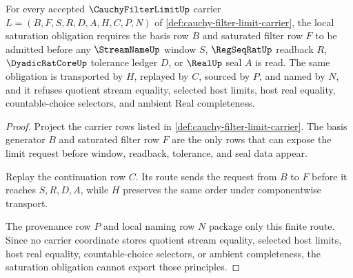 \begin{theorem}
\label{thm:cauchy-filter-limit-basis-saturation-obligation}
For every accepted $\CauchyFilterLimitUp$ carrier $L=(B,F,S,R,D,A,H,C,P,N)$ of \autoref{def:cauchy-filter-limit-carrier}, the local saturation obligation requires the basis row $B$ and saturated filter row $F$ to be admitted before any $\StreamNameUp$ window $S$, $\RegSeqRatUp$ readback $R$, $\DyadicRatCoreUp$ tolerance ledger $D$, or $\RealUp$ seal $A$ is read. The same obligation is transported by $H$, replayed by $C$, sourced by $P$, and named by $N$, and it refuses quotient stream equality, selected host limits, host real equality, countable-choice selectors, and ambient Real completeness.
\end{theorem}
\begin{proof}
Project the carrier rows listed in \autoref{def:cauchy-filter-limit-carrier}. The basis generator $B$ and saturated filter row $F$ are the only rows that can expose the limit request before window, readback, tolerance, and seal data appear.

Replay the continuation row $C$. Its route sends the request from $B$ to $F$ before it reaches $S,R,D,A$, while $H$ preserves the same order under componentwise transport.

The provenance row $P$ and local naming row $N$ package only this finite route. Since no carrier coordinate stores quotient stream equality, selected host limits, host real equality, countable-choice selectors, or ambient completeness, the saturation obligation cannot export those principles.
\end{proof}

